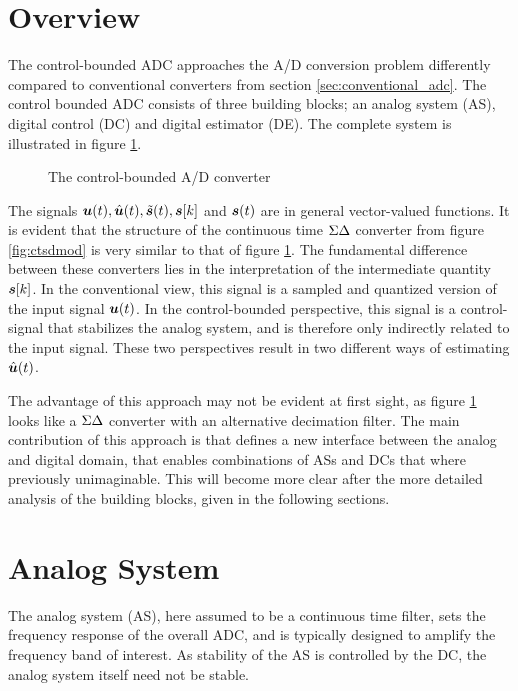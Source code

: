 \section{Overview}
The control-bounded ADC approaches the A/D conversion problem differently compared to conventional converters from section \ref{sec:conventional_adc}. The control bounded ADC consists of three building blocks; an analog system (AS), digital control (DC) and digital estimator (DE). The complete system is illustrated in figure \ref{fig:cbadc}.

\begin{figure}[htbp]
    
    \centering
    \caption{The control-bounded A/D converter}
    \label{fig:cbadc}
\end{figure}

The signals $\bm{u}(t), \hat{\bm{u}}(t), \tilde{\bm{s}}(t), \bm{s}[k]$ and $\bm{s}(t)$ are in general vector-valued functions. It is evident that the structure of the continuous time $\Sigma\Delta$ converter from figure \ref{fig:ctsdmod} is very similar to that of figure \ref{fig:cbadc}. The fundamental difference between these converters lies in the interpretation of the intermediate quantity $\bm{s}[k]$. In the conventional view, this signal is a sampled and quantized version of the input signal $\bm{u}(t)$. In the control-bounded perspective, this signal is a control-signal that stabilizes the analog system, and is therefore only indirectly related to the input signal. These two perspectives result in two different ways of estimating $\hat{\bm{u}}(t)$.

The advantage of this approach may not be evident at first sight, as figure \ref{fig:cbadc} looks like a $\Sigma\Delta$ converter with an alternative decimation filter. The main contribution of this approach is that defines a new interface between the analog and digital domain, that enables combinations of ASs and DCs that where previously unimaginable. This will become more clear after the more detailed analysis of the building blocks, given in the following sections.

\section{Analog System}
\label{subsec:analog_system}
The analog system (AS), here assumed to be a continuous time filter, sets the frequency response of the overall ADC, and is typically designed to amplify the frequency band of interest. As stability of the AS is controlled by the DC, the analog system itself need not be stable.

